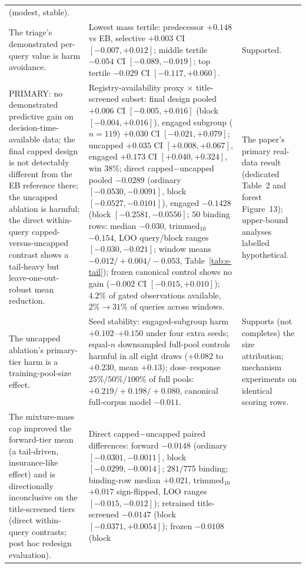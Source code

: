 \documentclass[11pt]{article}
\begin{document}
\begin{longtable}{p{} p{} p{}}
(modest, stable). \\
The triage's demonstrated per-query value is harm avoidance. & Lowest mass
tertile: predecessor $+0.148$ vs EB, selective $+0.003$ CI $[-0.007,+0.012]$;
middle tertile $-0.054$ CI $[-0.089,-0.019]$; top tertile $-0.029$ CI
$[-0.117,+0.060]$. & Supported. \\
PRIMARY: no demonstrated predictive gain on decision-time-available
data; the final
capped design is not detectably different from the EB reference there;
the uncapped ablation is harmful; the direct within-query
capped-versus-uncapped contrast shows a tail-heavy but
leave-one-out-robust mean reduction. &
Registry-availability proxy $\times$ title-screened subset: final design
pooled $+0.006$ CI $[-0.005,+0.016]$ (block $[-0.004,+0.016]$), engaged
subgroup ($n=119$) $+0.030$ CI $[-0.021,+0.079]$; uncapped $+0.035$ CI
$[+0.008,+0.067]$, engaged $+0.173$ CI $[+0.040,+0.324]$, win $38\%$;
direct capped$-$uncapped pooled $-0.0289$ (ordinary
$[-0.0530,-0.0091]$, block $[-0.0527,-0.0101]$), engaged $-0.1428$
(block $[-0.2581,-0.0556]$; $50$ binding rows: median $-0.030$,
trimmed$_{10}$ $-0.154$, LOO query/block ranges $[-0.030,-0.021]$;
window means $-0.012/+0.004/-0.053$, Table~\ref{tab:s-tail});
frozen canonical control shows no gain ($-0.002$ CI $[-0.015,+0.010]$);
$4.2\%$
of gated observations available, $2\%\to31\%$ of queries across windows. &
The paper's primary real-data result (dedicated Table~2 and forest
Figure~13); upper-bound analyses labelled hypothetical. \\
The uncapped ablation's primary-tier harm is a training-pool-size effect. &
Seed stability: engaged-subgroup harm $+0.102$--$+0.150$ under four extra
seeds; equal-$n$ downsampled full-pool controls harmful in all eight draws
($+0.082$ to $+0.230$, mean $+0.13$); dose--response $25\%/50\%/100\%$ of
full pools:
$+0.219/+0.198/+0.080$, canonical full-corpus model $-0.011$. & Supports
(not completes) the size attribution; mechanism experiments on identical
scoring rows. \\
The mixture-mass cap improved the forward-tier mean (a tail-driven,
insurance-like effect) and is directionally inconclusive on the
title-screened tiers (direct
within-query contrasts; post hoc
redesign evaluation). & Direct capped$-$uncapped paired differences:
forward $-0.0148$ (ordinary $[-0.0301,-0.0011]$, block
$[-0.0299,-0.0014]$; $281/775$ binding; binding-row median $+0.021$,
trimmed$_{10}$ $+0.017$ sign-flipped, LOO ranges $[-0.015,-0.012]$);
retrained title-screened
$-0.0147$ (block $[-0.0371,+0.0054]$); frozen $-0.0108$ (block

\end{longtable}
\end{document}
